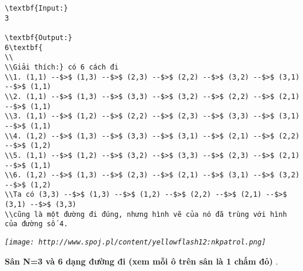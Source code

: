\begin{verbatim}
\textbf{Input:}
3

\textbf{Output:}
6\textbf{
\\
\\Giải thích:} có 6 cách đi
\\1. (1,1) --$>$ (1,3) --$>$ (2,3) --$>$ (2,2) --$>$ (3,2) --$>$ (3,1) --$>$ (1,1)
\\2. (1,1) --$>$ (1,3) --$>$ (3,3) --$>$ (3,2) --$>$ (2,2) --$>$ (2,1) --$>$ (1,1)
\\3. (1,1) --$>$ (1,2) --$>$ (2,2) --$>$ (2,3) --$>$ (3,3) --$>$ (3,1) --$>$ (1,1)
\\4. (1,2) --$>$ (1,3) --$>$ (3,3) --$>$ (3,1) --$>$ (2,1) --$>$ (2,2) --$>$ (1,2)
\\5. (1,1) --$>$ (1,2) --$>$ (3,2) --$>$ (3,3) --$>$ (2,3) --$>$ (2,1) --$>$ (1,1)
\\6. (1,2) --$>$ (1,3) --$>$ (2,3) --$>$ (2,1) --$>$ (3,1) --$>$ (3,2) --$>$ (1,2)
\\Ta có (3,3) --$>$ (1,3) --$>$ (1,2) --$>$ (2,2) --$>$ (2,1) --$>$ (3,1) --$>$ (3,3) 
\\cũng là một đường đi đúng, nhưng hình vẽ của nó đã trùng với hình của đường số 4.\end{verbatim}

\emph{
\texttt{[image: http://www.spoj.pl/content/yellowflash12:nkpatrol.png]}}

\textbf{    Sân N=3 và 6 dạng đường đi (xem mỗi ô trên sân là 1 chấm đỏ)   }   .
